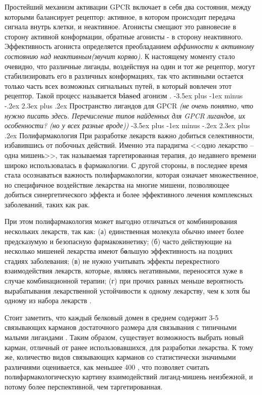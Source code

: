 \documentclass[a4paper,14pt]{extreport}
\makeatletter
\renewcommand{\section}{\@startsection{section}{1}{0pt}%
	{-3.5ex plus -1ex minus -.2ex}%
	{2.3ex plus .2ex}%
	{\centering\hyphenpenalty=10000\normalfont\Large\bfseries}}
\makeatother
\begin{document}
	Простейший механизм активации GPCR включает в себя два состояния, между которыми балансирует рецептор: активное, в котором происходит передача сигнала внутрь клетки, и неактивное. Агонисты смещают это равновесие в сторону активной конформации, обратные агонисты - в сторону неактивного. Эффективность агониста определяется преобладанием \textit{аффинности к активному состоянию над неактивным(звучит коряво)}. К настоящему моменту стало очевидно, что различные лиганды, воздействуя на один и тот же рецептор, могут стабилизировать его в различных конформациях, так что активными остается только часть всех возможных сигнальных путей, в который вовлечен этот рецептор. Такой процесс называется \textbf{biased} агонизм \cite{Lane2017}.
	\section{Пространство лигандов для GPCR}
	\textit{(не очень понятно, что нужно писать здесь. Перечисление типов найденных для GPCR лигандов, их особенности? (но у всех разные вроде))}
	\section{Полифармакология}
	При разработке лекарств важно добиться селективности, избавившись от побочных действий. Именно эта парадигма <<одно лекарство -- одна мишень>>, так называемая таргетированная терапия, до недавнего времени широко использовалась в фармакологии. С другой стороны, в последнее время стала осознаваться важность полифармакологии, которая означает множественное, но специфичное воздействие лекарства на многие мишени, позволяющее добиться синергетического эффекта и более эффективного лечения комплексных заболеваний, таких как рак\cite{Anighoro2014}. 
	
	При этом полифармакология может выгодно отличаться от комбинирования нескольких лекарств, так как: (а) единственная молекула обычно имеет более предсказумую и безопасную фармакокинетику; (б) часто действующие на несколько мишеней лекарства имеют б\textbf{о}льшую эффективность на поздних стадиях заболевания; (в) не нужно учитывать эффекты перекрестного взаимодействия лекарств, которые, являясь негативными, переносятся хуже в случае комбинационной терапии; (г) при прочих равных меньше вероятность вырабатывания лекарственной устойчивости к одному лекарству, чем к хотя бы одному из набора лекарств \cite{Anighoro2014}.
	
	Стоит заметить, что каждый белковый домен в среднем содержит 3-5 связывающих карманов достаточного размера для связывания с типичными малыми лигандами \cite{SKOLNICK20151163}. Таким образом, существует возможность выбрать новый карман, отличный от ранее использовавшихся, для разработки лекарства. К тому же, количество видов связывающих карманов со статистически значимыми различиями оценивается, как меньшее 400 \cite{SKOLNICK20151163}, что позволяет считать полифармакологическую картину взаимодействий лиганд-мишень неизбежной, и потому более перспективной, чем таргетированная.
		
\end{document}

